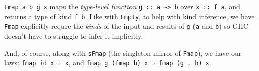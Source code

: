 \documentclass[]{article}
\newenvironment{Shaded}{}{}
\newcommand{\KeywordTok}[1]{\textcolor[rgb]{0.00,0.44,0.13}{\textbf{{#1}}}}
\newcommand{\DataTypeTok}[1]{\textcolor[rgb]{0.56,0.13,0.00}{{#1}}}
\newcommand{\CommentTok}[1]{\textcolor[rgb]{0.38,0.63,0.69}{\textit{{#1}}}}
\newcommand{\OtherTok}[1]{\textcolor[rgb]{0.00,0.44,0.13}{{#1}}}
\newcommand{\FunctionTok}[1]{\textcolor[rgb]{0.02,0.16,0.49}{{#1}}}
\newcommand{\NormalTok}[1]{{#1}}
\begin{document}
\begin{Shaded}
\end{Shaded}

\texttt{Fmap\ a\ b\ g\ x} maps the \emph{type-level function}
\texttt{g\ ::\ a\ \textasciitilde{}\textgreater{}\ b} over \texttt{x\ ::\ f\ a},
and returns a type of kind \texttt{f\ b}. Like with \texttt{Empty}, to help with
kind inference, we have \texttt{Fmap} explicitly requre the \emph{kinds} of the
input and results of \texttt{g} (\texttt{a} and \texttt{b}) so GHC doesn't have
to struggle to infer it implicitly.

And, of course, along with \texttt{sFmap} (the singleton mirror of
\texttt{Fmap}), we have our laws: \texttt{fmap\ id\ x\ =\ x}, and
\texttt{fmap\ g\ (fmap\ h)\ x\ =\ fmap\ (g\ .\ h)\ x}.
\end{document}
